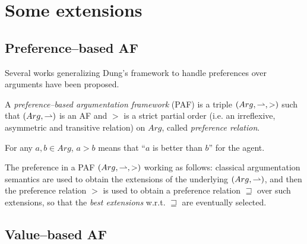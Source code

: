 \section{Some extensions}


\cite{ArgAI2009}

\subsection{Preference--based AF}



Several works generalizing Dung's framework to handle preferences over arguments have been proposed. 



\begin{df}
    A \textit{preference--based argumentation framework} (PAF) is a triple {\color{purple} $(Arg,\rightharpoonup,>)$} such that $(Arg,\rightharpoonup)$ is an AF and $>$ is a strict partial order  (i.e. an irreflexive, asymmetric and transitive relation) on $Arg$, 
    called \textit{preference relation}.    
\end{df}



For any $a,b \in Arg$, 
$a > b$ means that ``$a$ is better than $b$'' for the agent. 



The preference in a PAF $(Arg,\rightharpoonup,>)$ working as follows: 
classical argumentation semantics are used to obtain the extensions of the underlying $(Arg,\rightharpoonup)$, 
and then the preference relation $>$ is used to obtain a preference relation $\sqsupseteq$ over such extensions, 
so that the \textit{best extensions} w.r.t. $\sqsupseteq$ are eventually selected.






\subsection{Value--based AF}


